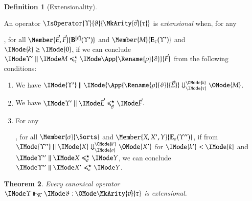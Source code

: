 \documentclass[11pt]{article}
\newtheorem{thm}{Theorem}[section]
\theoremstyle{definition}
\newtheorem{definition}[thm]{Definition}
\theoremstyle{notation}
\theoremstyle{remark}
\numberwithin{equation}{section}
\newcommand\EvalN[5]{\IMode{#1}\parallel\IMode{#4}\Downarrow^{\OMode{#3}}_{\IMode{#2}}\OMode{#5}}
\newcommand\Exprs{\mathbf{E}}
\newcommand\BTms{\mathbf{B}}
\begin{document}
\begin{definition}[Extensionality]
  \label{def:extensionality}

  An operator $\IsOperator{\Upsilon}{\vartheta}{\MkArity{\vec{v}}{\tau}}$ is
  \emph{extensional} when, for any
  , for all $\Member{\vec{E},\vec{F}}{\BTms^{[\vec{v}]}(\Upsilon')}$ and
  $\Member{M}{\Exprs_\tau(\Upsilon')}$ and $\IMode{k}\geq\IMode{0}$, if we can conclude
  $\PBinRel{\preccurlyeq^\star_\tau}{\Upsilon'}{M}{\App{\Rename{\rho}{\vartheta}}{\vec{F}}}$
  from the following conditions:
  \begin{enumerate}
    \item
      We have $\EvalN{\Upsilon'}{\tau}{k}{\App{\Rename{\rho}{\vartheta}}{\vec{E}}}{M}$.

    \item
      We have $\PBinRel{\preccurlyeq^\star_{\vec{v}}}{\Upsilon'}{\vec{E}}{\vec{F}}$.

    \item
      For any
      , for all $\Member{\sigma}{\Sorts}$ and $\Member{X,X',Y}{\Exprs_\sigma(\Upsilon'')}$, if
      from $\EvalN{\Upsilon''}{\sigma}{k'}{X}{X'}$ for $\IMode{k'}<\IMode{k}$ and
      $\PBinRel{\preccurlyeq^\star_\sigma}{\Upsilon''}{X}{Y}$, we can conclude
      $\PBinRel{\preccurlyeq^\star_\sigma}{\Upsilon''}{X'}{Y}$.
  \end{enumerate}

\end{definition}

\begin{thm}
  Every canonical operator
  $\IsCanOperator{\Upsilon}{\vartheta}{\MkArity{\vec{v}}{\tau}}$ is
  extensional.
\end{thm}
\end{document}
